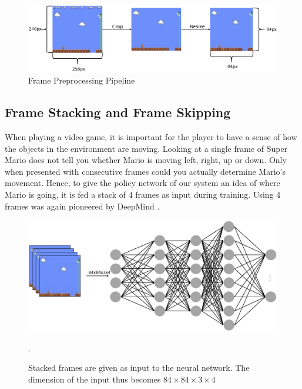 \documentclass[notitlepage,a4paper,11pt]{article}
\begin{document}
\begin{figure}[!htb]
\centering
\includegraphics[trim={0 4.5cm 0 5cm},clip,width=1\linewidth]{figs/frame_preprocessing.eps}
\caption{Frame Preprocessing Pipeline}
\end{figure}



\subsection{Frame Stacking and Frame Skipping} \label{frame_stacking_skipping}
When playing a video game, it is important for the player to have a sense of how the objects in the environment are moving. Looking at a single frame of Super Mario does not tell you whether Mario is moving left, right, up or down. Only when presented with consecutive frames could you actually determine Mario's movement. Hence, to give the policy network of our system an idea of where Mario is going, it is fed a stack of 4 frames as input during training. Using 4 frames was again pioneered by DeepMind \cite{DBLP:journals/corr/MnihKSGAWR13}.

\begin{figure}[!htb]
\centering
\includegraphics[trim={0 2cm 0 2cm}, clip, width=.75\linewidth]{figs/frame_stacking_nn.eps}
\caption{Stacked frames are given as input to the neural network. The dimension of the input thus becomes $84 \times 84 \times 3 \times 4$}.
\end{figure}
\end{document}
